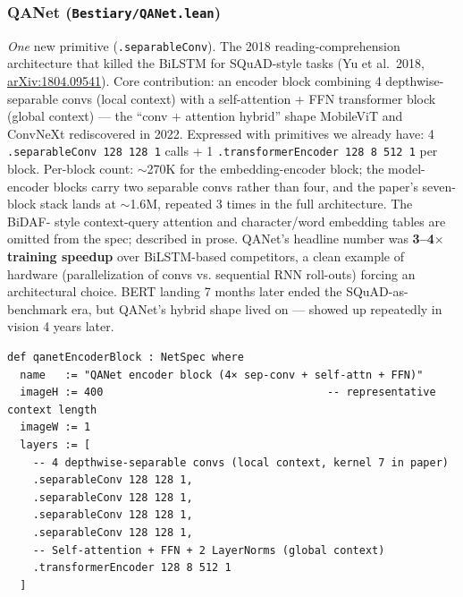 \subsubsection*{QANet (\texttt{Bestiary/QANet.lean})}
\emph{One} new primitive (\texttt{.separableConv}). The 2018 reading-comprehension
architecture that killed the BiLSTM for SQuAD-style tasks (Yu et al.\ 2018,
\href{https://arxiv.org/abs/1804.09541}{arXiv:1804.09541}). Core contribution: an encoder block combining 4 depthwise-
separable convs (local context) with a self-attention + FFN
transformer block (global context) --- the ``conv + attention
hybrid'' shape MobileViT and ConvNeXt rediscovered in 2022.
Expressed with primitives we already have: 4
\texttt{.separableConv 128 128 1} calls + 1
\texttt{.transformerEncoder 128 8 512 1} per block. Per-block count:
$\sim$270K for the embedding-encoder block; the model-encoder blocks carry
two separable convs rather than four, and the paper's seven-block stack lands
at $\sim$1.6M, repeated 3 times in the full architecture. The BiDAF-
style context-query attention and character/word embedding tables
are omitted from the spec; described in prose. QANet's headline
number was \textbf{3--4$\times$ training speedup} over BiLSTM-based
competitors, a clean example of hardware (parallelization of convs
vs. sequential RNN roll-outs) forcing an architectural choice.
BERT landing 7 months later ended the SQuAD-as-benchmark era, but
QANet's hybrid shape lived on --- showed up repeatedly in vision
4 years later.

\begin{verbatim}
def qanetEncoderBlock : NetSpec where
  name   := "QANet encoder block (4× sep-conv + self-attn + FFN)"
  imageH := 400                                   -- representative context length
  imageW := 1
  layers := [
    -- 4 depthwise-separable convs (local context, kernel 7 in paper)
    .separableConv 128 128 1,
    .separableConv 128 128 1,
    .separableConv 128 128 1,
    .separableConv 128 128 1,
    -- Self-attention + FFN + 2 LayerNorms (global context)
    .transformerEncoder 128 8 512 1
  ]
\end{verbatim}

